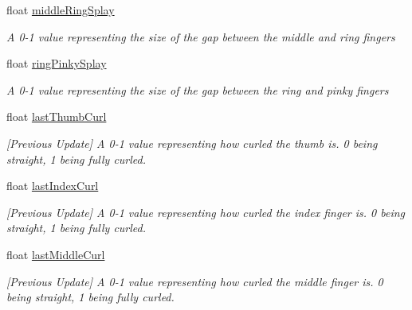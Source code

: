 \begin{DoxyCompactItemize}
float \mbox{\hyperlink{interface_valve_1_1_v_r_1_1_i_steam_v_r___action___skeleton___source_a82419b88ed43b9967ba432cb623ac65d}{middle\+Ring\+Splay}}
\begin{DoxyCompactList}\small\item\em A 0-\/1 value representing the size of the gap between the middle and ring fingers \end{DoxyCompactList}\item 
float \mbox{\hyperlink{interface_valve_1_1_v_r_1_1_i_steam_v_r___action___skeleton___source_a24d08a246cac735c6302a15479001eac}{ring\+Pinky\+Splay}}
\begin{DoxyCompactList}\small\item\em A 0-\/1 value representing the size of the gap between the ring and pinky fingers \end{DoxyCompactList}\item 
float \mbox{\hyperlink{interface_valve_1_1_v_r_1_1_i_steam_v_r___action___skeleton___source_a56213cbee5496236ba17b0b552740f2c}{last\+Thumb\+Curl}}
\begin{DoxyCompactList}\small\item\em \mbox{[}Previous Update\mbox{]} A 0-\/1 value representing how curled the thumb is. 0 being straight, 1 being fully curled. \end{DoxyCompactList}\item 
float \mbox{\hyperlink{interface_valve_1_1_v_r_1_1_i_steam_v_r___action___skeleton___source_a7d769bb760cebc4687b5768b1348dfee}{last\+Index\+Curl}}
\begin{DoxyCompactList}\small\item\em \mbox{[}Previous Update\mbox{]} A 0-\/1 value representing how curled the index finger is. 0 being straight, 1 being fully curled. \end{DoxyCompactList}\item 
float \mbox{\hyperlink{interface_valve_1_1_v_r_1_1_i_steam_v_r___action___skeleton___source_a04d68434e94198e7b2f273a8183b66e0}{last\+Middle\+Curl}}
\begin{DoxyCompactList}\small\item\em \mbox{[}Previous Update\mbox{]} A 0-\/1 value representing how curled the middle finger is. 0 being straight, 1 being fully curled. \end{DoxyCompactList}\item 

\end{DoxyCompactItemize}
